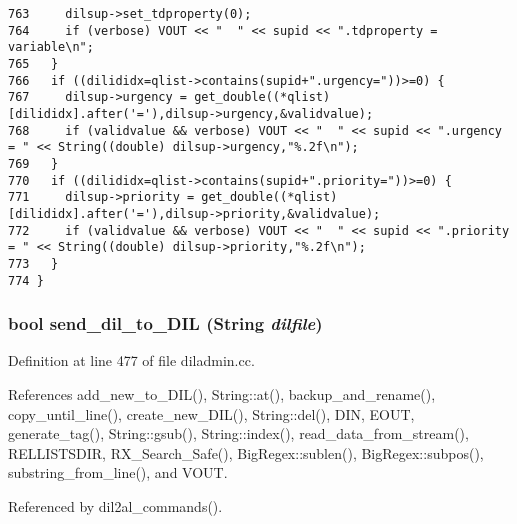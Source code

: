 \begin{verbatim}
763     dilsup->set_tdproperty(0);
764     if (verbose) VOUT << "  " << supid << ".tdproperty = variable\n";
765   }
766   if ((dilididx=qlist->contains(supid+".urgency="))>=0) {
767     dilsup->urgency = get_double((*qlist)[dilididx].after('='),dilsup->urgency,&validvalue);
768     if (validvalue && verbose) VOUT << "  " << supid << ".urgency = " << String((double) dilsup->urgency,"%.2f\n");
769   }
770   if ((dilididx=qlist->contains(supid+".priority="))>=0) {
771     dilsup->priority = get_double((*qlist)[dilididx].after('='),dilsup->priority,&validvalue);
772     if (validvalue && verbose) VOUT << "  " << supid << ".priority = " << String((double) dilsup->priority,"%.2f\n");
773   }
774 }
\end{verbatim}\normalsize 
{}
\subsubsection{\setlength{\rightskip}{0pt plus 5cm}bool send\_\-dil\_\-to\_\-DIL ({\bf String} {\em dilfile})}\label{diladmin_8cc_a5}




Definition at line 477 of file diladmin.cc.

References add\_\-new\_\-to\_\-DIL(), String::at(), backup\_\-and\_\-rename(), copy\_\-until\_\-line(), create\_\-new\_\-DIL(), String::del(), DIN, EOUT, generate\_\-tag(), String::gsub(), String::index(), read\_\-data\_\-from\_\-stream(), RELLISTSDIR, RX\_\-Search\_\-Safe(), Big\-Regex::sublen(), Big\-Regex::subpos(), substring\_\-from\_\-line(), and VOUT.

Referenced by dil2al\_\-commands().



